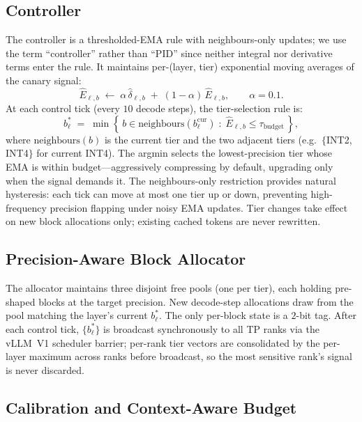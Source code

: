 \documentclass{article}
\begin{document}
\subsection{Controller}
\label{sec:controller}

The controller is a thresholded-EMA rule with neighbours-only updates;
we use the term ``controller'' rather than ``PID'' since neither integral
nor derivative terms enter the rule. It maintains per-(layer, tier)
exponential moving averages of the canary signal:
\begin{equation}
  \widehat{E}_{\ell,b} \;\leftarrow\; \alpha\, \hat{\delta}_{\ell,b}
  \;+\; (1-\alpha)\, \widehat{E}_{\ell,b}, \qquad \alpha=0.1.
  \label{eq:ema}
\end{equation}
At each control tick (every $10$ decode steps), the tier-selection rule is:
\begin{equation}
  b_\ell^* \;=\; \min\!\left\{\, b \in \mathrm{neighbours}(b_\ell^{\mathrm{cur}})
  \;:\; \widehat{E}_{\ell,b} \le \tau_{\mathrm{budget}} \,\right\},
  \label{eq:argmin}
\end{equation}
where $\mathrm{neighbours}(b)$ is the current tier and the two adjacent
tiers (e.g.\ $\{$INT2, INT4$\}$ for current INT4). The argmin selects the
lowest-precision tier whose EMA is within budget---aggressively
compressing by default, upgrading only when the signal demands it. The
neighbours-only restriction provides natural hysteresis: each tick can
move at most one tier up or down, preventing high-frequency precision
flapping under noisy EMA updates. Tier changes take effect on new block
allocations only; existing cached tokens are never rewritten.

\subsection{Precision-Aware Block Allocator}
\label{sec:allocator}

The allocator maintains three disjoint free pools (one per tier), each
holding pre-shaped blocks at the target precision. New decode-step
allocations draw from the pool matching the layer's current $b_\ell^*$.
The only per-block state is a $2$-bit tag. After each control
tick, $\{b_\ell^*\}$ is broadcast synchronously to all TP ranks via the
vLLM~V1 scheduler barrier; per-rank tier vectors are consolidated
by the per-layer maximum across ranks before broadcast, so the most
sensitive rank's signal is never discarded.

\subsection{Calibration and Context-Aware Budget}
\label{sec:tau}
\end{document}

